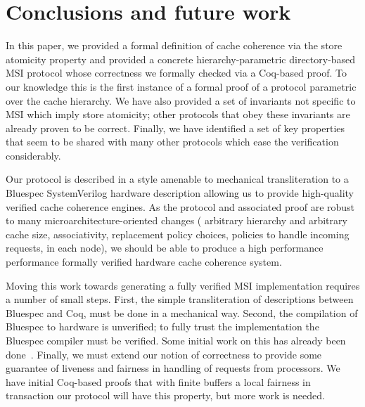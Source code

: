 \section{Conclusions and future work}

In this paper, we provided a formal definition of cache coherence via the store
atomicity property and provided a concrete hierarchy-parametric directory-based
MSI protocol whose correctness we formally checked via a Coq-based proof. To our
knowledge this is the first instance of a formal proof of a protocol parametric
over the cache hierarchy. We have also provided a set of invariants not
specific to MSI which imply store atomicity; other protocols that obey these
invariants are already proven to be correct. Finally, we have identified a set
of key properties that seem to be shared with many other protocols which ease
the verification considerably.

Our protocol is described in a style amenable to mechanical transliteration to a
Bluespec SystemVerilog hardware description allowing us to provide high-quality
verified cache coherence engines. As the protocol and associated proof are robust
to many microarchitecture-oriented changes (\eg{} arbitrary hierarchy and
arbitrary cache size, associativity, replacement policy choices, policies to
handle incoming requests, \etc{} in each node), we should be able to produce a
high performance performance formally verified hardware cache coherence system.

Moving this work towards generating a fully verified MSI implementation
requires a number of small steps. First, the simple transliteration of
descriptions between Bluespec and Coq, must be done in a mechanical way.
Second, the compilation of Bluespec to hardware is unverified; to fully trust
the implementation the Bluespec compiler must be verified. Some initial work on
this has already been done~\cite{TDBLP:conf/cav/BraibantC13}. Finally, we must
extend our notion of correctness to provide some guarantee of
liveness and fairness in handling of requests from processors. We have
initial Coq-based proofs that with finite buffers a local fairness in
transaction our protocol will have this property, but more work is needed. 







